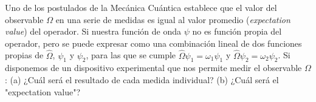 \documentclass[addpoints,spanish, 12pt,a4paper]{exam}
\begin{document}
\begin{questions}
    \question[1\half] Uno de los postulados de la Mecánica
    Cuántica establece que el valor 
    del observable $\Omega$ en una serie de medidas es 
    igual al valor promedio (\textit{expectation value})
    del operador. Si nuestra función de onda $\psi$ no
    es función propia del operador, pero se puede expresar
    como una combinación lineal de dos funciones propias 
    de $\hat{\Omega}$, $\psi_1$ y $\psi_2$, para las que se
    cumple $\hat{\Omega}\psi_1=\omega_1\psi_1$ y
    $\hat{\Omega}\psi_2=\omega_2\psi_2$. Si disponemos
    de un dispositivo experimental que nos permite medir
    el observable $\Omega$: (a) ¿Cuál será el resultado de
    cada medida individual? (b) ¿Cuál será el "expectation
    value"?
    \newpage
    
    

\end{questions}
\end{document}

